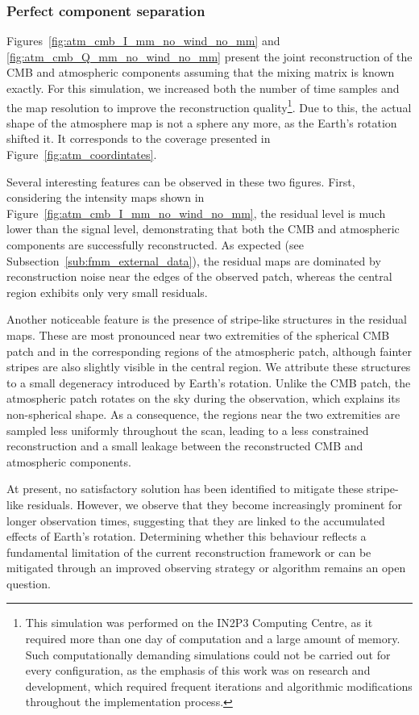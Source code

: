 \documentclass[../../thesis.tex]{subfiles}
\begin{document}
\subsubsection{Perfect component separation}

Figures~\ref{fig:atm_cmb_I_mm_no_wind_no_mm} and \ref{fig:atm_cmb_Q_mm_no_wind_no_mm} present the joint reconstruction of the CMB and atmospheric components assuming that the mixing matrix is known exactly. For this simulation, we increased both the number of time samples and the map resolution to improve the reconstruction quality\footnote{This simulation was performed on the IN2P3 Computing Centre, as it required more than one day of computation and a large amount of memory. Such computationally demanding simulations could not be carried out for every configuration, as the emphasis of this work was on research and development, which required frequent iterations and algorithmic modifications throughout the implementation process.}. Due to this, the actual shape of the atmosphere map is not a sphere any more, as the Earth's rotation shifted it. It corresponds to the coverage presented in Figure~\ref{fig:atm_coordintates}.

Several interesting features can be observed in these two figures. First, considering the intensity maps shown in Figure~\ref{fig:atm_cmb_I_mm_no_wind_no_mm}, the residual level is much lower than the signal level, demonstrating that both the CMB and atmospheric components are successfully reconstructed. As expected (see Subsection~\ref{sub:fmm_external_data}), the residual maps are dominated by reconstruction noise near the edges of the observed patch, whereas the central region exhibits only very small residuals.

Another noticeable feature is the presence of stripe-like structures in the residual maps. These are most pronounced near two extremities of the spherical CMB patch and in the corresponding regions of the atmospheric patch, although fainter stripes are also slightly visible in the central region. We attribute these structures to a small degeneracy introduced by Earth's rotation. Unlike the CMB patch, the atmospheric patch rotates on the sky during the observation, which explains its non-spherical shape. As a consequence, the regions near the two extremities are sampled less uniformly throughout the scan, leading to a less constrained reconstruction and a small leakage between the reconstructed CMB and atmospheric components.

At present, no satisfactory solution has been identified to mitigate these stripe-like residuals. However, we observe that they become increasingly prominent for longer observation times, suggesting that they are linked to the accumulated effects of Earth's rotation. Determining whether this behaviour reflects a fundamental limitation of the current reconstruction framework or can be mitigated through an improved observing strategy or algorithm remains an open question.
\end{document}
